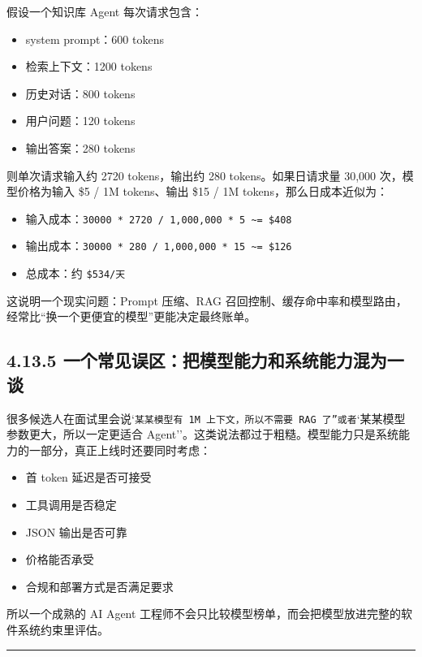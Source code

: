 假设一个知识库 Agent 每次请求包含：


\begin{itemize}[leftmargin=2em]
\item system prompt：600 tokens
\item 检索上下文：1200 tokens
\item 历史对话：800 tokens
\item 用户问题：120 tokens
\item 输出答案：280 tokens
\end{itemize}

则单次请求输入约 2720 tokens，输出约 280 tokens。如果日请求量 30,000 次，模型价格为输入 \$5 / 1M tokens、输出 \$15 / 1M tokens，那么日成本近似为：


\begin{itemize}[leftmargin=2em]
\item 输入成本：\texttt{30000 * 2720 / 1,000,000 * 5 \textasciitilde{}= \$408}
\item 输出成本：\texttt{30000 * 280 / 1,000,000 * 15 \textasciitilde{}= \$126}
\item 总成本：约 \texttt{\$534/天}
\end{itemize}

这说明一个现实问题：Prompt 压缩、RAG 召回控制、缓存命中率和模型路由，经常比``换一个更便宜的模型''更能决定最终账单。


\subsection{4.13.5 一个常见误区：把模型能力和系统能力混为一谈}

很多候选人在面试里会说`\texttt{某某模型有 1M 上下文，所以不需要 RAG 了''或者}`某某模型参数更大，所以一定更适合 Agent''。这类说法都过于粗糙。模型能力只是系统能力的一部分，真正上线时还要同时考虑：


\begin{itemize}[leftmargin=2em]
\item 首 token 延迟是否可接受
\item 工具调用是否稳定
\item JSON 输出是否可靠
\item 价格能否承受
\item 合规和部署方式是否满足要求
\end{itemize}

所以一个成熟的 AI Agent 工程师不会只比较模型榜单，而会把模型放进完整的软件系统约束里评估。


\bigskip\hrule\bigskip

